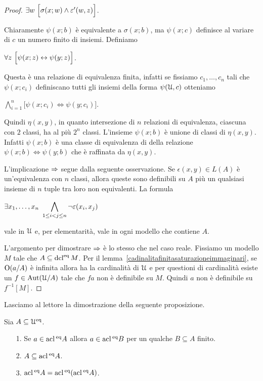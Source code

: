 \begin{proof}
$\exists w\  \Big[\sigma(x;w)\wedge\varepsilon'(w,z)\Big]$.

Chiaramente $\psi(x;b)$ \`e equivalente a $\sigma(x;b)$, ma $\psi(x;c)$ definisce al variare di $c$ un numero finito di insiemi. Definiamo

$\forall z\  \Big[\psi(x;z)\leftrightarrow \psi(y;z)\Big]$.

Questa \`e una relazione di equivalenza finita,  infatti se fissiamo $c_1,\dots,c_n$ tali che $\psi(x;c_i)$ definiscano tutti gli insiemi della forma $\psi(\EuScript U,c)$ otteniamo 

$\displaystyle\bigwedge^n_{i=1} \Big[\psi(x;c_i)\iff \psi(y;c_i)\Big]$.

Quindi $\eta(x,y)$, in quanto intersezione di $n$ relazioni di equivalenza, ciascuna con $2$ classi, ha al pi\`u $2^n$ classi. L'insieme $\psi(x;b)$ \`e unione di classi di $\eta(x,y)$. Infatti $\psi(x;b)$ \`e una classe di equivalenza di della relazione $\psi(x;b)\iff \psi(y;b)$ che \`e raffinata da $\eta(x,y)$.

L'implicazione $\Rightarrow$ segue dalla seguente osservazione. Se $\epsilon(x,y)\in L(A)$ \`e un'equivalenza con $n$ classi, allora queste sono definibili su $A$ pi\`u un qualsiasi insieme di $n$ tuple tra loro non equivalenti. La formula 

\hfil$\displaystyle\E x_1,\dots,x_n\ \bigwedge_{1\le i<j\le n}\neg\epsilon(x_i,x_j)$

vale in $\EuScript U$ e, per elementarit\`a, vale in ogni modello che contiene $A$.

L'argomento per dimostrare $\Rightarrow$ \`e lo stesso che nel caso reale. Fissiamo un modello $M$ tale che $A\subseteq\mathop{\rm dcl}^{\rm eq} M$. Per il lemma~\ref{cadinalitafinitasaturazioneimmaginari}, se $\textrm{O}(a/A)$ \`e infinita allora ha la cardinalit\`a di $\EuScript U$ e per questioni di cardinalit\`a esiste un $f\in\textrm{Aut}(\EuScript U/A)$ tale che $fa$ non \`e definibile su $M$. Quindi $a$ non \`e definibile su $f^{-1}[M]$.
\end{proof}

Lasciamo al lettore la dimostrazione della seguente proposizione.

\begin{proposition}\label{acl123} Sia $A\subseteq\EuScript U^{\rm eq}$.
\begin{itemize}
\item[1.]  Se $a\in\mathop{\rm acl}\/^{\rm eq} A$ allora $a\in\mathop{\rm acl}\/^{\rm eq} B$ per un qualche $B\subseteq A$ finito.
\item[2.]  $A\subseteq \mathop{\rm acl}\/^{\rm eq} A$.
\item[3.]  $\mathop{\rm acl}\/^{\rm eq} A=\mathop{\rm acl}\/^{\rm eq}(\mathop{\rm acl}\/^{\rm eq} A)$.\QED
\end{itemize} 
\end{proposition}

